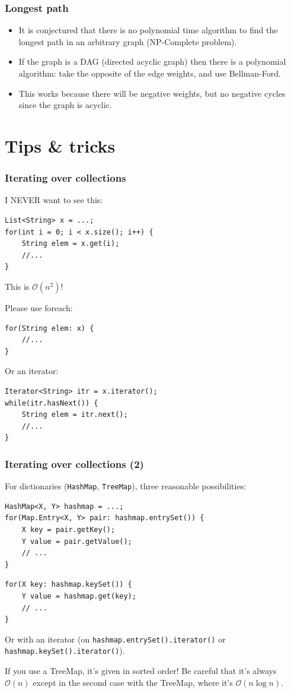 \documentclass[8pt,aspectratio=169]{beamer}
\begin{document}
\begin{frame}[fragile]
\frametitle{Longest path}
\begin{itemize}
	\item It is conjectured that there is no polynomial time algorithm to find the longest path in an arbitrary graph (NP-Complete problem).
	\item If the graph is a DAG (directed acyclic graph) then there is a polynomial algorithm: take the opposite of the edge weights, and use Bellman-Ford.
	\item This works because there will be negative weights, but no negative cycles since the graph is acyclic.
\end{itemize}
\end{frame}

\section{Tips \& tricks}

\begin{frame}[fragile]
\frametitle{Iterating over collections}
{\color{red} I NEVER want to see this:}
\begin{lstlisting}
List<String> x = ...;
for(int i = 0; i < x.size(); i++) {
	String elem = x.get(i);
	//...
}
\end{lstlisting}
{\color{red} This is $\mathcal{O}(n^2)$!}

{\color{blue} Please use foreach:}
\begin{lstlisting}
for(String elem: x) {
	//...
}
\end{lstlisting}

{\color{blue} Or an iterator:}
\begin{lstlisting}
Iterator<String> itr = x.iterator();
while(itr.hasNext()) {
	String elem = itr.next();
	//...
}
\end{lstlisting}
\end{frame}

\begin{frame}[fragile]
\frametitle{Iterating over collections (2)}
For dictionaries (\texttt{HashMap}, \texttt{TreeMap}), three reasonable possibilities:
\begin{lstlisting}
HashMap<X, Y> hashmap = ...;
for(Map.Entry<X, Y> pair: hashmap.entrySet()) {
	X key = pair.getKey();
	Y value = pair.getValue();
	// ...
}
\end{lstlisting}

\begin{lstlisting}
for(X key: hashmap.keySet()) {
	Y value = hashmap.get(key);
	// ...
}
\end{lstlisting}

Or with an iterator (on \texttt{hashmap.entrySet().iterator()} or \texttt{hashmap.keySet().iterator()}).

If you use a TreeMap, it's given in sorted order! Be careful that it's always $\mathcal{O}(n)$ except in the second case with the TreeMap, where it's $\mathcal{O}(n \log n)$.
\end{frame}
\end{document}
